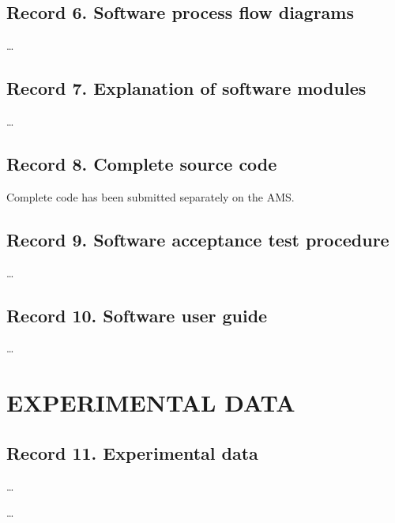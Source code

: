 \subsection{Record 6. Software process flow diagrams}

\ldots

\newpage

\subsection{Record 7. Explanation of software modules}

\ldots

\newpage

\subsection{Record 8. Complete source code}
Complete code has been submitted separately on the AMS.

\newpage

\subsection{Record 9. Software acceptance test procedure}

\ldots

\newpage

\subsection{Record 10. Software user guide}

\ldots

\newpage


\section{EXPERIMENTAL DATA}

\subsection{Record 11. Experimental data}


\ldots


\ldots

